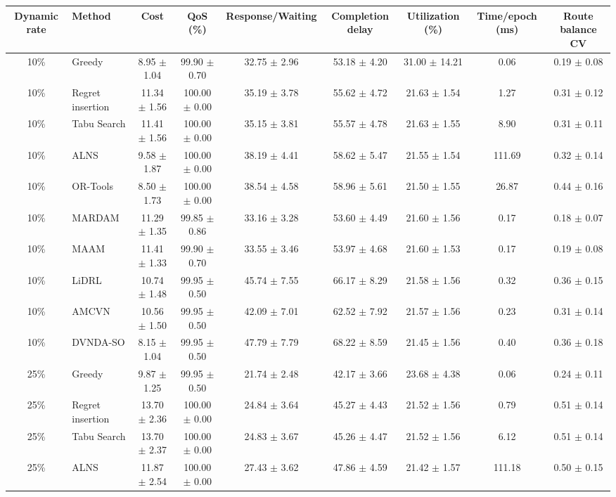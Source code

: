 \begin{tabular}{clccccccc}
\toprule
Dynamic rate & Method & Cost & QoS (\%) & Response/Waiting & Completion delay & Utilization (\%) & Time/epoch (ms) & Route balance CV \\
\midrule
10\% & Greedy & 8.95 $\pm$ 1.04 & 99.90 $\pm$ 0.70 & 32.75 $\pm$ 2.96 & 53.18 $\pm$ 4.20 & 31.00 $\pm$ 14.21 & 0.06 & 0.19 $\pm$ 0.08 \\
10\% & Regret insertion & 11.34 $\pm$ 1.56 & 100.00 $\pm$ 0.00 & 35.19 $\pm$ 3.78 & 55.62 $\pm$ 4.72 & 21.63 $\pm$ 1.54 & 1.27 & 0.31 $\pm$ 0.12 \\
10\% & Tabu Search & 11.41 $\pm$ 1.56 & 100.00 $\pm$ 0.00 & 35.15 $\pm$ 3.81 & 55.57 $\pm$ 4.78 & 21.63 $\pm$ 1.55 & 8.90 & 0.31 $\pm$ 0.11 \\
10\% & ALNS & 9.58 $\pm$ 1.87 & 100.00 $\pm$ 0.00 & 38.19 $\pm$ 4.41 & 58.62 $\pm$ 5.47 & 21.55 $\pm$ 1.54 & 111.69 & 0.32 $\pm$ 0.14 \\
10\% & OR-Tools & 8.50 $\pm$ 1.73 & 100.00 $\pm$ 0.00 & 38.54 $\pm$ 4.58 & 58.96 $\pm$ 5.61 & 21.50 $\pm$ 1.55 & 26.87 & 0.44 $\pm$ 0.16 \\
10\% & MARDAM & 11.29 $\pm$ 1.35 & 99.85 $\pm$ 0.86 & 33.16 $\pm$ 3.28 & 53.60 $\pm$ 4.49 & 21.60 $\pm$ 1.56 & 0.17 & 0.18 $\pm$ 0.07 \\
10\% & MAAM & 11.41 $\pm$ 1.33 & 99.90 $\pm$ 0.70 & 33.55 $\pm$ 3.46 & 53.97 $\pm$ 4.68 & 21.60 $\pm$ 1.53 & 0.17 & 0.19 $\pm$ 0.08 \\
10\% & LiDRL & 10.74 $\pm$ 1.48 & 99.95 $\pm$ 0.50 & 45.74 $\pm$ 7.55 & 66.17 $\pm$ 8.29 & 21.58 $\pm$ 1.56 & 0.32 & 0.36 $\pm$ 0.15 \\
10\% & AMCVN & 10.56 $\pm$ 1.50 & 99.95 $\pm$ 0.50 & 42.09 $\pm$ 7.01 & 62.52 $\pm$ 7.92 & 21.57 $\pm$ 1.56 & 0.23 & 0.31 $\pm$ 0.14 \\
10\% & DVNDA-SO & 8.15 $\pm$ 1.04 & 99.95 $\pm$ 0.50 & 47.79 $\pm$ 7.79 & 68.22 $\pm$ 8.59 & 21.45 $\pm$ 1.56 & 0.40 & 0.36 $\pm$ 0.18 \\
25\% & Greedy & 9.87 $\pm$ 1.25 & 99.95 $\pm$ 0.50 & 21.74 $\pm$ 2.48 & 42.17 $\pm$ 3.66 & 23.68 $\pm$ 4.38 & 0.06 & 0.24 $\pm$ 0.11 \\
25\% & Regret insertion & 13.70 $\pm$ 2.36 & 100.00 $\pm$ 0.00 & 24.84 $\pm$ 3.64 & 45.27 $\pm$ 4.43 & 21.52 $\pm$ 1.56 & 0.79 & 0.51 $\pm$ 0.14 \\
25\% & Tabu Search & 13.70 $\pm$ 2.37 & 100.00 $\pm$ 0.00 & 24.83 $\pm$ 3.67 & 45.26 $\pm$ 4.47 & 21.52 $\pm$ 1.56 & 6.12 & 0.51 $\pm$ 0.14 \\
25\% & ALNS & 11.87 $\pm$ 2.54 & 100.00 $\pm$ 0.00 & 27.43 $\pm$ 3.62 & 47.86 $\pm$ 4.59 & 21.42 $\pm$ 1.57 & 111.18 & 0.50 $\pm$ 0.15 \\

\end{tabular}

